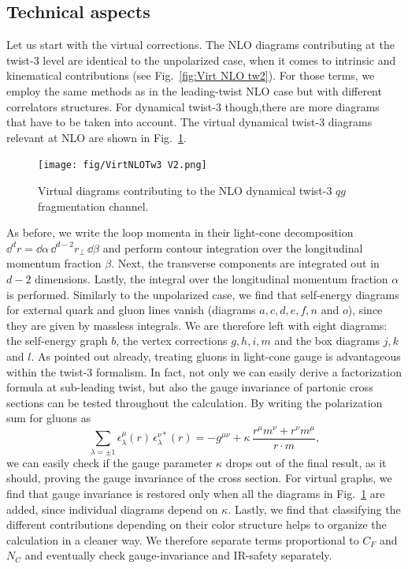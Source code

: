 \subsection{Technical aspects}
Let us start with the virtual corrections. The NLO diagrams contributing at the twist-3 level are identical to the unpolarized case, when it comes to intrinsic and kinematical contributions (see Fig.~\ref{fig:Virt NLO tw2}). For those terms, we employ the same methods as in the leading-twist NLO case but with different correlators structures. For dynamical twist-3 though,there are more diagrams that have to be taken into account. The virtual dynamical twist-3 diagrams relevant at NLO are shown in Fig.~\ref{fig:Virt NLO tw3}.
\begin{figure}[ht]
    \centering
    \texttt{[image: fig/VirtNLOTw3 V2.png]}
    \caption{Virtual diagrams contributing to the NLO dynamical twist-3 $qg$ fragmentation channel.}
    \label{fig:Virt NLO tw3}
    \end{figure}
As before, we write the loop momenta in their light-cone decomposition $\dd ^d r=\dd \alpha\,\dd^{d-2} r_\perp \,\dd \beta$ and perform contour integration over the longitudinal momentum fraction $\beta$. Next, the transverse components are integrated out in $d-2$ dimensions. Lastly, the integral over the longitudinal momentum fraction $\alpha$ is performed. Similarly to the unpolarized case, we find that self-energy diagrams for external quark and gluon lines vanish (diagrams $a,c,d,e,f,n$ and $o$), since they are given by massless integrals. We are therefore left with eight diagrams: the self-energy graph $b$, the vertex corrections $g,h,i,m$ and the box diagrams $j,k$ and $l$. As pointed out already, treating gluons in light-cone gauge is advantageous within the twist-3 formalism. In fact, not only we can easily derive a factorization formula at sub-leading twist, but also the gauge invariance of partonic cross sections can be tested throughout the calculation. By writing the polarization sum for gluons as
\begin{equation}
    \sum_{\lambda=\pm 1} \epsilon_\lambda^\mu(r)\,\epsilon_\lambda^{\nu*}(r)= -g^{\mu\nu}+\kappa\,\frac{r^\mu m^\nu+r^\nu m^\mu}{r \cdot m},
\end{equation}
we can easily check if the gauge parameter $\kappa$ drops out of the final result, as it should, proving the gauge invariance of the cross section. For virtual graphs, we find that gauge invariance is restored only when all the diagrams in Fig.~\ref{fig:Virt NLO tw3} are added, since individual diagrams depend on $\kappa$. Lastly, we find that classifying the different contributions depending on their color structure helps to organize the calculation in a cleaner way. We therefore separate terms proportional to $C_F$ and $N_C$ and eventually check gauge-invariance and IR-safety separately.

